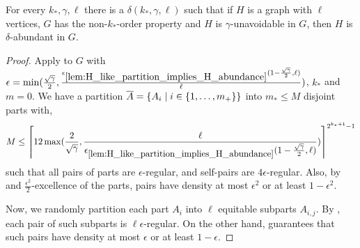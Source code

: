     \begin{theorem} \label{lem:property_testing_with_stable_partitions}
        For every $k_*, \gamma, \ell$ there is a $\delta(k_*, \gamma, \ell)$ such that if $H$ is a graph with $\ell$
        vertices, $G$ has the non-$k_*$-order property and $H$ is $\gamma$-unavoidable in $G$, then $H$ is
        $\delta$-abundant in $G$.
        \begin{proof}
            Apply  to $G$ with $\epsilon = \min ( \frac{\sqrt{\gamma}}{2},
                \frac{\epsilon_{\ref{lem:H_like_partition_implies_H_abundance}} ( 1 - \frac{\sqrt{\gamma}}{2}, \ell )}{\ell} )$,
            $k_*$ and $m=0$.
            We have a partition $\overline{A} = \{ A_i \mid i \in \{ 1, \dots, m_+ \} \}$ into $m_* \leq M$
            disjoint parts with,
            \[
                M \leq \left\lceil 12 \max( \frac{2}{\sqrt{\gamma}}, \frac{\ell}{\epsilon_{\ref{lem:H_like_partition_implies_H_abundance}}
                    ( 1 - \frac{\sqrt{\gamma}}{2}, \ell )} ) \right\rceil^{2^{k_*+1}-1}
            \]
            such that all pairs of parts are $\epsilon$-regular, and self-pairs are $4 \epsilon$-regular.
            Also, by  and $\frac{\epsilon^2}{2}$-excellence of the parts,
            pairs have density at most $\epsilon^2$ or at least $1 - \epsilon^2$. 

            Now, we randomly partition each part $A_i$ into $\ell$ equitable subparts $A_{i,j}$.
            By , each pair of such subparts is $\ell \epsilon$-regular.
            On the other hand,  guarantees that such pairs have density
            at most $\epsilon$ or at least $1 - \epsilon$.


\end{proof}
\end{theorem}
